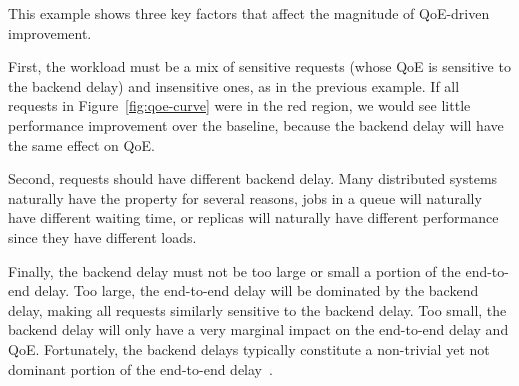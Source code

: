 This example shows three key factors that affect the magnitude of QoE-driven improvement.
\begin{packeditemize}
\item First, the workload must be a mix of sensitive requests (whose QoE is sensitive to the backend delay) and insensitive ones, as in the previous example.
If all requests in Figure~\ref{fig:qoe-curve} were in the red region, we would see little performance improvement over the baseline, because the backend delay will have the same effect on QoE. 

\item Second, requests should have different backend delay. Many distributed systems naturally have the property for several reasons, \eg jobs in a queue will naturally have different waiting time, or replicas will naturally have different performance since they have different loads.

\item Finally, the backend delay must not be too large or small a portion of the end-to-end delay. Too large, the end-to-end delay will be dominated by the backend delay, making all requests similarly sensitive to the backend delay. Too small, the backend delay will only have a very marginal impact on the end-to-end delay and QoE. 
Fortunately, the backend delays typically constitute a non-trivial yet not dominant portion of the end-to-end delay~\cite{dqbarge,mystery,timecard}.
\end{packeditemize}

